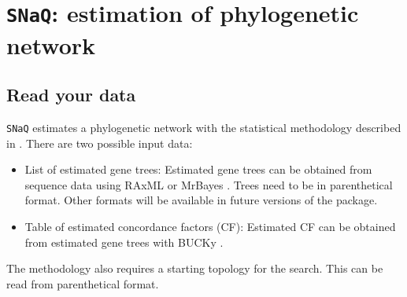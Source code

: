 \documentclass[12pt]{article}
\begin{document}
\section{\texttt{SNaQ}: estimation of phylogenetic network}

\subsection{Read your data}
\texttt{SNaQ} estimates a phylogenetic network with the statistical
methodology described in \citep{Solis-Lemus2015}. There are two possible
input data:
\begin{itemize}
\item{List of estimated gene trees: Estimated gene trees can be
    obtained from sequence data using RAxML \citep{raxmlv8} or
    MrBayes \citep{Huelsenbeck2001}. Trees need to be in parenthetical
    format. Other formats will be available in future versions of the
    package.}
\item{Table of estimated concordance factors (CF): Estimated CF can be
    obtained from estimated gene trees with BUCKy \cite{Ane2007}.}
\end{itemize}
The methodology also requires a starting topology for the search. This
can be read from parenthetical format.
\end{document}
